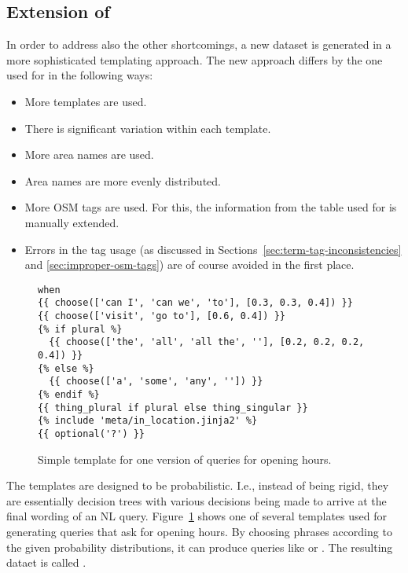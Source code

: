 \subsection{Extension of \nlmapstwo{}}

In order to address also the other shortcomings, a new dataset is generated in a
more sophisticated templating approach. The new approach differs by the one used
for \nlmapstwo{} in the following ways:

\begin{itemize}
\item More templates are used.
\item There is significant variation within each template.
\item More area names are used.
\item Area names are more evenly distributed.
\item More OSM tags are used. For this, the information from the table used for
  \nlmapstwo{} is manually extended.
\item Errors in the tag usage (as discussed in
  Sections~\ref{sec:term-tag-inconsistencies} and \ref{sec:improper-osm-tags})
  are of course avoided in the first place.
\end{itemize}

\begin{figure}[h]
  \centering
  \begin{lstlisting}[style=MyJinja]
when
{{ choose(['can I', 'can we', 'to'], [0.3, 0.3, 0.4]) }}
{{ choose(['visit', 'go to'], [0.6, 0.4]) }}
{% if plural %}
  {{ choose(['the', 'all', 'all the', ''], [0.2, 0.2, 0.2, 0.4]) }}
{% else %}
  {{ choose(['a', 'some', 'any', '']) }}
{% endif %}
{{ thing_plural if plural else thing_singular }}
{% include 'meta/in_location.jinja2' %}
{{ optional('?') }}
  \end{lstlisting}
  \caption[Opening hours template]{Simple template for one version of queries
    for opening hours.}
  \label{fig:opening-hours-template}
\end{figure}

The templates are designed to be probabilistic. I.e., instead of being rigid,
they are essentially decision trees with various decisions being made to arrive
at the final wording of an NL query. Figure~\ref{fig:opening-hours-template}
shows one of several templates used for generating queries that ask for opening
hours. By choosing phrases according to the given probability distributions, it
can produce queries like  or . The resulting dataet is called
\nlmapsthreea{}.

